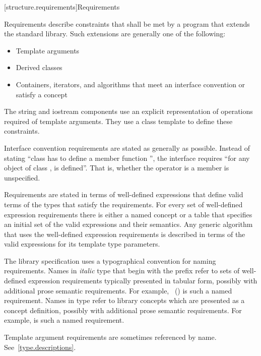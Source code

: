 [structure.requirements]{Requirements}

\pnum
{}%
Requirements describe constraints that shall be met by a \Cpp{} program that extends the standard library.
Such extensions are generally one of the following:

\begin{itemize}
\item Template arguments
\item Derived classes
\item Containers, iterators, and algorithms that meet an interface convention or
  satisfy a concept
\end{itemize}

\pnum
The string and iostream components use an explicit representation of operations
required of template arguments. They use a class template  to
define these constraints.

\pnum
Interface convention requirements are stated as generally as possible. Instead
of stating ``class  has to define a member function '', the
interface requires ``for any object  of class ,  is
defined''. That is, whether the operator is a member is unspecified.

\pnum
Requirements are stated in terms of well-defined expressions that define valid terms of
the types that satisfy the requirements. For every set of well-defined expression
requirements there is either a named concept or a table that specifies an initial set of the valid expressions and
their semantics. Any generic algorithm that uses the
well-defined expression requirements is described in terms of the valid expressions for
its template type parameters.

\pnum
The library specification uses a typographical convention for naming
requirements. Names in \textit{italic} type that begin with the prefix
\oldconcept{} refer to sets of well-defined expression requirements typically
presented in tabular form, possibly with additional prose semantic requirements.
For example, ~() is such a named
requirement. Names in  type refer to library concepts
which are presented as a concept definition, possibly with additional
prose semantic requirements. For example,
is such a named requirement.

\pnum
Template argument requirements are sometimes referenced by name.
See~\ref{type.descriptions}.

